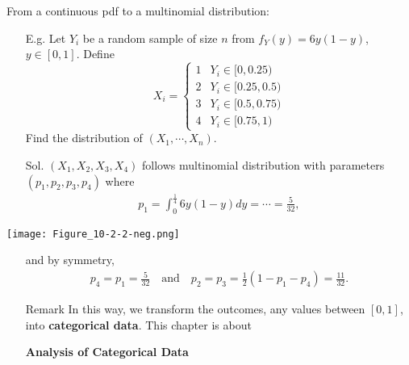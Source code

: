 \begin{frame}

From a continuous pdf to a multinomial distribution:
\vfill
\begin{enumerate}
	\item[E.g.] Let $Y_i$ be a random sample of size $n$ from $f_Y(y)=6y(1-y)$, $y\in[0,1]$.
		Define
		\[
		X_i =
		\begin{cases}
			1 & Y_i \in [0,0.25)\\
			2 & Y_i \in [0.25,0.5)\\
			3 & Y_i \in [0.5,0.75)\\
			4 & Y_i \in [0.75,1)
		\end{cases}
		\]
		Find the distribution of $(X_1,\cdots,X_n)$.
		\vfill
	\item[Sol.] $(X_1,X_2,X_3,X_4)$ follows multinomial distribution with parameters $(p_1,p_2,p_3,p_4)$ where
		\begin{align*}
			p_1 = \int_0^{\frac{1}{4}}6y(1-y)dy = \cdots = \frac{5}{32},
		\end{align*}
\end{enumerate}
\end{frame}
\begin{frame}
\centering
\texttt{[image: Figure\_10-2-2-neg.png]}
\vfill
\begin{enumerate}
	\item[] and by symmetry,
		\begin{align*}
			 p_4=p_1=\frac{5}{32}\quad\text{and}\quad
			 p_2=p_3 = \frac{1}{2}\left(1-p_1-p_4\right) = \frac{11}{32}.
		\end{align*}
		\myEnd
		\bigskip
	\item[Remark] In this way, we transform the outcomes, any values between $[0,1]$, into \textcolor{yellow!80!black}{\bf categorical data}.
This chapter is about
\item[]
		\begin{center}
		\bf Analysis of Categorical Data
		\end{center}
\end{enumerate}
\end{frame}
